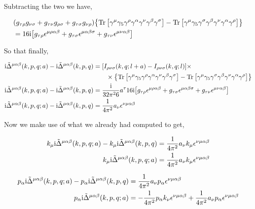 Subtracting the two we have,

\begin{align}
    &\qty(g_{\tau\rho}g_{\nu\sigma}+g_{\tau\nu}g_{\rho\sigma}+g_{\tau\sigma}g_{\nu\rho})\qty{\Tr\qty[\gamma^\mu\gamma_5\gamma^\rho\gamma^\alpha\gamma^\nu\gamma^\beta\gamma^\sigma]-\Tr\qty[\gamma^\mu\gamma_5\gamma^\sigma\gamma^\beta\gamma^\nu\gamma^\alpha\gamma^\rho]}\nonumber\\
    &=16\textnormal{i}\qty[ g_{\tau\rho}\epsilon^{\mu\rho\alpha\beta}+g_{\tau\sigma}\epsilon^{\mu\alpha\beta\sigma}+g_{\tau\nu}\epsilon^{\mu\nu\alpha\beta}]\nonumber
\end{align}

So that finally,

\begin{align}
    \textnormal{i}{\tilde\Delta}^{\mu\alpha\beta}\qty(k,p,q;a)-\textnormal{i}{\tilde\Delta}^{\mu\alpha\beta}\qty(k,p,q)&=\qty[
    I_{\rho\nu\sigma}\qty(k,q;l+a)-I_{\rho\nu\sigma}\qty(k,q;l)]\times\nonumber\\
    &\quad\quad\times\qty{
    \Tr\qty[\gamma^\mu\gamma_5\gamma^\rho\gamma^\alpha\gamma^\nu\gamma^\beta\gamma^\sigma]
    -\Tr\qty[\gamma^\mu\gamma_5\gamma^\sigma\gamma^\beta\gamma^\nu\gamma^\alpha\gamma^\rho]}\nonumber\\
    \textnormal{i}{\tilde\Delta}^{\mu\alpha\beta}\qty(k,p,q;a)-\textnormal{i}{\tilde\Delta}^{\mu\alpha\beta}\qty(k,p,q)&=
    \frac{\textnormal{i}}{32\pi^26}a^\tau16\textnormal{i}
    \qty[ g_{\tau\rho}\epsilon^{\mu\rho\alpha\beta}+g_{\tau\sigma}\epsilon^{\mu\alpha\beta\sigma}+g_{\tau\nu}\epsilon^{\mu\nu\alpha\beta}]\nonumber\\
    \textnormal{i}{\tilde\Delta}^{\mu\alpha\beta}\qty(k,p,q;a)-\textnormal{i}{\tilde\Delta}^{\mu\alpha\beta}\qty(k,p,q)&=
    \frac{1}{4\pi^2}a_\nu
    \epsilon^{\nu\mu\alpha\beta}\nonumber
\end{align}

Now we make use of what we already had computed to get,

\begin{align}
    k_\mu\textnormal{i}{\tilde\Delta}^{\mu\alpha\beta}\qty(k,p,q;a)-k_\mu\textnormal{i}{\tilde\Delta}^{\mu\alpha\beta}\qty(k,p,q)&=
    \frac{1}{4\pi^2}a_\nu k_\mu
    \epsilon^{\nu\mu\alpha\beta}\nonumber\\
    k_\mu\textnormal{i}{\tilde\Delta}^{\mu\alpha\beta}\qty(k,p,q;a)&=
    \frac{1}{4\pi^2}a_\nu k_\mu
    \epsilon^{\nu\mu\alpha\beta}\nonumber
\end{align}

\begin{align}
    p_\alpha\textnormal{i}{\tilde\Delta}^{\mu\alpha\beta}\qty(k,p,q;a)-p_\alpha\textnormal{i}{\tilde\Delta}^{\mu\alpha\beta}\qty(k,p,q)&=
    \frac{1}{4\pi^2}a_\nu p_\alpha
    \epsilon^{\nu\mu\alpha\beta}\nonumber\\
    p_\alpha\textnormal{i}{\tilde\Delta}^{\mu\alpha\beta}\qty(k,p,q;a)&=-\frac{1}{4\pi^2}p_\alpha k_\nu\epsilon^{\nu\mu\alpha\beta}
    +\frac{1}{4\pi^2}a_\nu p_\alpha
    \epsilon^{\nu\mu\alpha\beta}\nonumber
\end{align}

